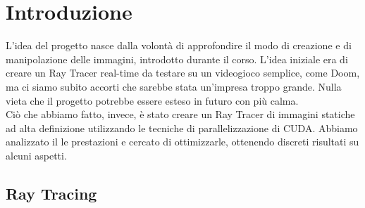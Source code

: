 \documentclass[main.tex]{subfiles}
\begin{document}
\section{Introduzione}\label{sec:introduzione}

\hspace*{0.25in}L'idea del progetto nasce dalla volontà di approfondire il modo di creazione e di manipolazione delle immagini, introdotto durante il corso. L'idea iniziale era di creare un Ray Tracer real-time da testare su un videogioco semplice, come Doom, ma ci siamo subito accorti che sarebbe stata un'impresa troppo grande. Nulla vieta che il progetto potrebbe essere esteso in futuro con più calma. \\
Ciò che abbiamo fatto, invece, è stato creare un Ray Tracer di immagini statiche ad alta definizione utilizzando le tecniche di parallelizzazione di CUDA. Abbiamo analizzato il le prestazioni e cercato di ottimizzarle, ottenendo discreti risultati su alcuni aspetti.

\subsection{Ray Tracing}
\end{document}
